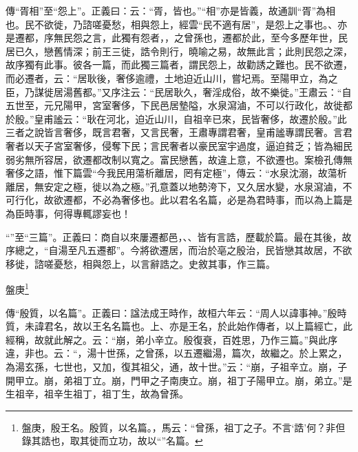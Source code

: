 {\noindent\zhuan{}\fzbyks 傳“胥相”至“怨上”。正義曰：云：“胥，皆也。”“相”亦是皆義，故通訓“胥”為相也。民不欲徙，乃諮嗟憂愁，相與怨上，經雲“民不適有居”，是怨上之事也。、亦是遷都，序無民怨之言，此獨有怨者，，之曾孫也，遷都於此，至今多歷年世，民居已久，戀舊情深；前王三徙，誥令則行，曉喻之易，故無此言；此則民怨之深，故序獨有此事。彼各一篇，而此獨三篇者，謂民怨上，故勸誘之難也。民不欲遷，而必遷者，云：“居耿後，奢侈逾禮，土地迫近山川，嘗圮焉。至陽甲立，為之臣，乃謀徙居湯舊都。”又序注云：“民居耿久，奢淫成俗，故不樂徙。”王肅云：“自五世至，元兄陽甲，宮室奢侈，下民邑居墊隘，水泉瀉滷，不可以行政化，故徙都於殷。”皇甫謐云：“耿在河北，迫近山川，自祖辛已來，民皆奢侈，故遷於殷。”此三者之說皆言奢侈，既言君奢，又言民奢，王肅專謂君奢，皇甫謐專謂民奢。言君奢者以天子宮室奢侈，侵奪下民；言民奢者以豪民室宇過度，逼迫貧乏；皆為細民弱劣無所容居，欲遷都改制以寬之。富民戀舊，故違上意，不欲遷也。案檢孔傳無奢侈之語，惟下篇雲“今我民用蕩析離居，罔有定極”，傳云：“水泉沈溺，故蕩析離居，無安定之極，徙以為之極。”孔意蓋以地勢洿下，又久居水變，水泉瀉滷，不可行化，故欲遷都，不必為奢侈也。此以君名名篇，必是為君時事，而以為上篇是為臣時事，何得專輒謬妄也！ \par}

{\noindent\shu{}\fzkt “”至“三篇”。正義曰：商自以來屢遷都邑，、、皆有言誥，歷載於篇。最在其後，故序總之，“自湯至凡五遷都”。今將欲遷居，而治於亳之殷治，民皆戀其故居，不欲移徙，諮嗟憂愁，相與怨上，以言辭誥之。史敘其事，作三篇。 \par}

盤庚\footnote{盤庚，殷王名。殷質，以名篇。，馬云：“曾孫，祖丁之子。不言‘誥’何？非但錄其誥也，取其徙而立功，故以“”名篇。}


{\noindent\zhuan{}\fzbyks 傳“殷質，以名篇”。正義曰：諡法成王時作，故桓六年云：“周人以諱事神。”殷時質，未諱君名，故以王名名篇也。上、亦是王名，於此始作傳者，以上篇經亡，此經稱，故就此解之。云：“崩，弟小辛立。殷復衰，百姓思，乃作三篇。”與此序違，非也。云：“，湯十世孫，之曾孫，以五遷繼湯，篇次，故繼之。於上累之，為湯玄孫，七世也，又加，復其祖父，通，故十世。”云：“崩，子祖辛立。崩，子開甲立。崩，弟祖丁立。崩，門甲之子南庚立。崩，祖丁子陽甲立。崩，弟立。”是生祖辛，祖辛生祖丁，祖丁生，故為曾孫。 \par}

